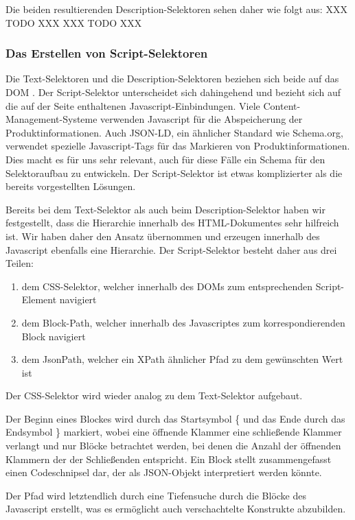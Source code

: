 Die beiden resultierenden Description-Selektoren sehen daher wie folgt aus:
XXX TODO XXX
XXX TODO XXX

\subsubsection{Das Erstellen von Script-Selektoren}
\label{subsubsec:erstellen-von-script-selektoren}

Die Text-Selektoren und die Description-Selektoren beziehen sich beide auf das DOM .
Der Script-Selektor unterscheidet sich dahingehend und bezieht sich auf die auf der Seite enthaltenen
Javascript-Einbindungen.
Viele Content-Management-Systeme verwenden Javascript für die Abspeicherung der Produktinformationen.
Auch JSON-LD, ein ähnlicher Standard wie Schema.org, verwendet spezielle Javascript-Tags für das Markieren von
Produktinformationen.
Dies macht es für uns sehr relevant, auch für diese Fälle ein Schema für den Selektoraufbau zu entwickeln.
Der Script-Selektor ist etwas komplizierter als die bereits vorgestellten Lösungen.

Bereits bei dem Text-Selektor als auch beim Description-Selektor haben wir festgestellt, dass die Hierarchie
innerhalb des HTML-Dokumentes sehr hilfreich ist.
Wir haben daher den Ansatz übernommen und erzeugen innerhalb des Javascript ebenfalls eine Hierarchie.
Der Script-Selektor besteht daher aus drei Teilen:
\begin{enumerate}
    \item dem CSS-Selektor, welcher innerhalb des DOMs zum entsprechenden Script-Element navigiert
    \item dem Block-Path, welcher innerhalb des Javascriptes zum korrespondierenden Block navigiert
    \item dem JsonPath, welcher ein XPath ähnlicher Pfad zu dem gewünschten Wert ist
\end{enumerate}

Der CSS-Selektor wird wieder analog zu dem Text-Selektor aufgebaut.

Der Beginn eines Blockes wird durch das Startsymbol \{ und das Ende durch das Endsymbol \} markiert, wobei eine
öffnende Klammer eine schließende Klammer verlangt und nur Blöcke betrachtet werden, bei denen die Anzahl der
öffnenden Klammern der der Schließenden entspricht.
Ein Block stellt zusammengefasst einen Codeschnipsel dar, der als JSON-Objekt interpretiert werden könnte.

Der Pfad wird letztendlich durch eine Tiefensuche durch die Blöcke des Javascript erstellt, was es ermöglicht auch
verschachtelte Konstrukte abzubilden.


